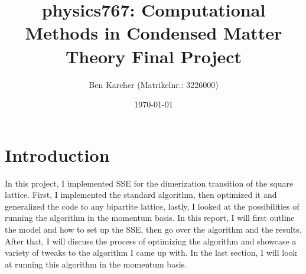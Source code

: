 \documentclass[ngerman]{scrartcl}
\title{physics767: Computational Methods in Condensed Matter Theory Final Project}
\author{Ben Karcher (Matrikelnr.: 3226000)}
\date{\today}
\begin{document}
\maketitle
\section*{Introduction}
In this project, I implemented SSE for the dimerization transition of the square lattice. First, I implemented the standard algorithm, then optimized it and generalized the code to any bipartite lattice, lastly, I looked at the possibilities of running the algorithm in the momentum basis. In this report, I will first outline the model and how to set up the SSE, then go over the algorithm and the results. After that, I will discuss the process of optimizing the algorithm and showcase a variety of tweaks to the algorithm I came up with. In the last section, I will look at running this algorithm in the momentum basis.
\end{document}
